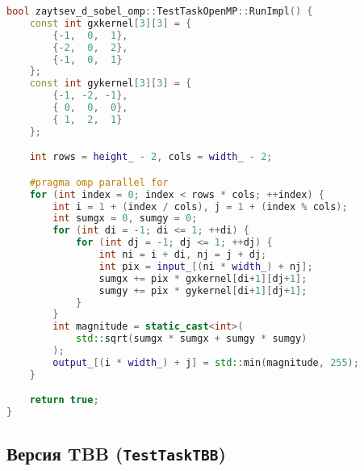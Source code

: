 \documentclass[12pt]{article}
\begin{document}
\begin{lstlisting}[language=C++, caption={Параллельная реализация с OpenMP}]
bool zaytsev_d_sobel_omp::TestTaskOpenMP::RunImpl() {
    const int gxkernel[3][3] = {
        {-1,  0,  1},
        {-2,  0,  2},
        {-1,  0,  1}
    };
    const int gykernel[3][3] = {
        {-1, -2, -1},
        { 0,  0,  0},
        { 1,  2,  1}
    };

    int rows = height_ - 2, cols = width_ - 2;

    #pragma omp parallel for
    for (int index = 0; index < rows * cols; ++index) {
        int i = 1 + (index / cols), j = 1 + (index % cols);
        int sumgx = 0, sumgy = 0;
        for (int di = -1; di <= 1; ++di) {
            for (int dj = -1; dj <= 1; ++dj) {
                int ni = i + di, nj = j + dj;
                int pix = input_[(ni * width_) + nj];
                sumgx += pix * gxkernel[di+1][dj+1];
                sumgy += pix * gykernel[di+1][dj+1];
            }
        }
        int magnitude = static_cast<int>(
            std::sqrt(sumgx * sumgx + sumgy * sumgy)
        );
        output_[(i * width_) + j] = std::min(magnitude, 255);
    }

    return true;
}
\end{lstlisting}

\subsection{Версия TBB (\texttt{TestTaskTBB})}
\end{document}
